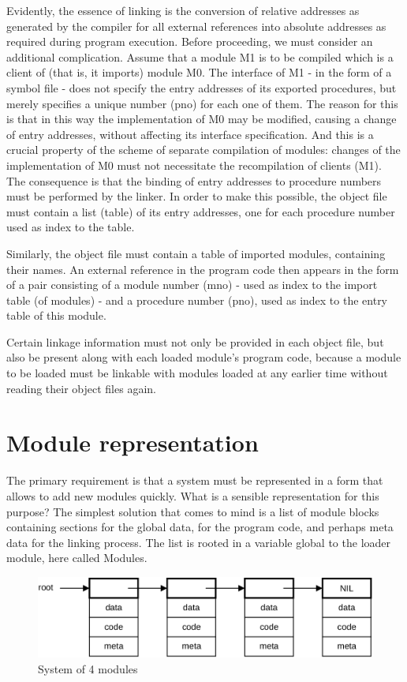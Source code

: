 Evidently, the essence of linking is the conversion of relative addresses as generated by the compiler
for all external references into absolute addresses as required during program execution. Before
proceeding, we must consider an additional complication. Assume that a module M1 is to be
compiled which is a client of (that is, it imports) module M0. The interface of M1 - in the form of a
symbol file - does not specify the entry addresses of its exported procedures, but merely specifies a
unique number (pno) for each one of them. The reason for this is that in this way the implementation
of M0 may be modified, causing a change of entry addresses, without affecting its interface
specification. And this is a crucial property of the scheme of separate compilation of modules:
changes of the implementation of M0 must not necessitate the recompilation of clients (M1). The
consequence is that the binding of entry addresses to procedure numbers must be performed by the
linker. In order to make this possible, the object file must contain a list (table) of its entry addresses,
one for each procedure number used as index to the table.

Similarly, the object file must contain a table of imported modules, containing their names. An
external reference in the program code then appears in the form of a pair consisting of a module
number (mno) - used as index to the import table (of modules) - and a procedure number (pno), used
as index to the entry table of this module.

Certain linkage information must not only be provided in each object file, but also be present along
with each loaded module's program code, because a module to be loaded must be linkable with
modules loaded at any earlier time without reading their object files again.

\section{Module representation}
The primary requirement is that a system must be represented in a form that allows to add new
modules quickly. What is a sensible representation for this purpose? The simplest solution that
comes to mind is a list of module blocks containing sections for the global data, for the program code,
and perhaps meta data for the linking process. The list is rooted in a variable global to the loader
module, here called Modules.
\begin{figure}
  \label{fig:4modules}
  \centering
  \includegraphics[width=\textwidth]{i/j}
  \caption{System of 4 modules}
\end{figure}

